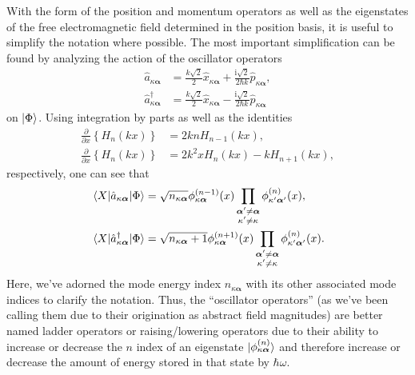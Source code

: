 \documentclass{article}
\numberwithin{equation}{section}
\begin{document}
With the form of the position and momentum operators as well as the eigenstates of the free electromagnetic field determined in the position basis, it is useful to simplify the notation where possible. The most important simplification can be found by analyzing the action of the oscillator operators
\begin{equation}
\begin{split}
\hat{a}_{\kappa\bm{\alpha}} &= \frac{k\sqrt{2}}{2}\hat{x}_{\kappa\bm{\alpha}} + \frac{\mathrm{i}\sqrt{2}}{2\hbar k}\hat{p}_{\kappa\bm{\alpha}},\\
\hat{a}_{\kappa\bm{\alpha}}^\dagger &= \frac{k\sqrt{2}}{2}\hat{x}_{\kappa\bm{\alpha}} - \frac{\mathrm{i}\sqrt{2}}{2\hbar k}\hat{p}_{\kappa\bm{\alpha}}
\end{split}
\end{equation}
on $|{\Phi}\rangle$. Using integration by parts as well as the identities
\begin{equation}
\begin{split}
\frac{\partial}{\partial x}\left\{H_n(kx)\right\} &= 2knH_{n-1}(kx),\\
\frac{\partial}{\partial x}\left\{H_n(kx)\right\} &= 2k^2xH_{n}(kx) - kH_{n+1}(kx),
\end{split}
\end{equation}
respectively, one can see that
\begin{equation}
\begin{split}
\mel{X}{\hat{a}_{\kappa\bm{\alpha}}}{\Phi} &= \sqrt{n_{\kappa\bm{\alpha}}}\phi_{\kappa\bm{\alpha}}^{(n - 1)}(x)\prod_{\substack{\bm{\alpha}'\neq\bm{\alpha}\\\kappa'\neq\kappa}}\phi_{\kappa'\bm{\alpha}'}^{(n)}(x),\\
\mel{X}{\hat{a}^\dagger_{\kappa\bm{\alpha}}}{\Phi} &= \sqrt{n_{\kappa\bm{\alpha}} + 1}\phi_{\kappa\bm{\alpha}}^{(n + 1)}(x)\prod_{\substack{\bm{\alpha}'\neq\bm{\alpha}\\\kappa'\neq\kappa}}\phi_{\kappa'\bm{\alpha}'}^{(n)}(x).
\end{split}
\end{equation}
Here, we've adorned the mode energy index $n_{\kappa\bm{\alpha}}$ with its other associated mode indices to clarify the notation. Thus, the ``oscillator operators'' (as we've been calling them due to their origination as abstract field magnitudes) are better named ladder operators or raising/lowering operators due to their ability to increase or decrease the $n$ index of an eigenstate $|{\phi_{\kappa\bm{\alpha}}^{(n)}}\rangle$ and therefore increase or decrease the amount of energy stored in that state by $\hbar\omega$.
\end{document}
